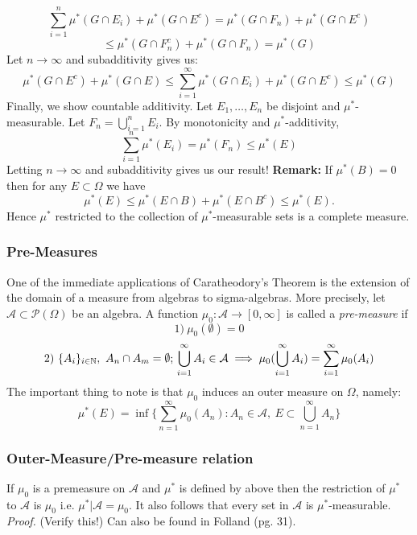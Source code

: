 \documentclass{article}
\begin{document}
\[
\sum_{i=1}^n \mu^*(G \cap E_i)+\mu^*(G\cap E^c) = \mu^*(G\cap F_n) + \mu^*(G\cap E^c)
\]
\[
\leq \mu^*(G\cap F_n^c) +\mu^*(G\cap F_n) = \mu^*(G)
\]
Let $n\to \infty$ and subadditivity gives us:
\[
\mu^*(G\cap E^c) +\mu^*(G\cap E) \leq \sum_{i=1}^{\infty} \mu^*(G \cap E_i)+\mu^*(G\cap E^c) \leq \mu^*(G)
\]
Finally, we show countable additivity. Let $E_1, \ldots, E_n$ be disjoint and  $\mu^*$-measurable. Let $F_n = \bigcup_{i=1}^nE_i$. By monotonicity and $\mu^*$-additivity, 
\[
\sum_{i=1}^n\mu^*(E_i) =\mu^*(F_n) \leq \mu^*(E)
\]
Letting $ n \to \infty$ and subadditivity gives us our result! \newline \newline
\textbf{Remark:} \newline \newline
If $\mu^*(B) = 0$ then for any $E \subset \Omega$ we have 
\[
\mu^*(E) \leq \mu^*(E\cap B) + \mu^*(E\cap B^c) \leq \mu^*(E).
\]
Hence $\mu^*$ restricted to the collection of $\mu^*$-measurable sets is a complete measure.
\subsubsection{Pre-Measures}
One of the immediate applications of Caratheodory's Theorem is the extension of the domain of a measure from algebras to sigma-algebras. More precisely, let $\mathcal{A} \subset\mathcal{P}(\Omega)$ be an algebra. A function $\mu_0:\mathcal{A} \to [0, \infty]$ is called a \textit{pre-measure} if 
\[
1) \ \mu_0(\emptyset) = 0
\]
\[
2) \ \{A_i\}_{i \in \mathbb{N}}, \ A_n \cap A_m = \emptyset ; \\\bigcup_{i=1}^{\infty}A_i \in \mathcal{A} \implies \mu_0(\bigcup_{i=1}^{\infty}A_i)=\sum_{i=1}^{\infty}\mu_0(A_i)
\]
The important thing to note is that $\mu_0$ induces an outer measure on $\Omega$, namely: 
\[
\mu^*(E)=\inf \{\sum_{n=1}^{\infty}\mu_0(A_n): A_n \in \mathcal{A}, \ E\subset \bigcup_{n=1}^{\infty}A_n\}
\]
\subsubsection{Outer-Measure/Pre-measure relation}
If $\mu_0$ is a premeasure on $\mathcal{A}$ and $\mu^*$ is defined by above then the restriction of $\mu^*$ to $\mathcal{A}$ is $\mu_0$ i.e. $\mu^*|\mathcal{A}=\mu_0$. It also follows that every set in $\mathcal{A}$ is $\mu^*$-measurable. \newline \newline
\textit{Proof.}\newline \newline
(Verify this!)\newline \newline
Can also be found in Folland (pg. 31).
\end{document}
